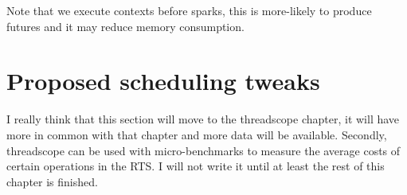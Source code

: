 
Note that we execute contexts before sparks,
this is more-likely to produce futures and it may reduce memory consumption.

\section{Proposed scheduling tweaks}
\label{sec:proposed_tweaks}

I really think that this section will move to the threadscope chapter,
it will have more in common with that chapter and more data will be
available.
Secondly, threadscope can be used with micro-benchmarks to measure the
average costs of certain operations in the RTS.
I will not write it until at least the rest of this chapter is finished.

%
%

%

%
%

